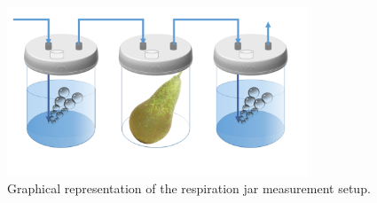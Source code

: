 \begin{figure}
	\centering
	\includegraphics[width=0.8\textwidth]{figure/paper 1/pot.png}
	\caption{Graphical representation of the respiration jar measurement setup.}
	\label{figJar}
\end{figure}
